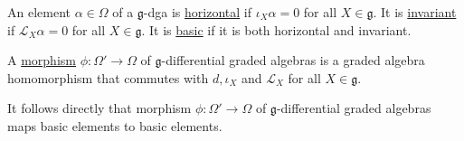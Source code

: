\begin{defn}
	An element $\alpha\in\Omega$ of a $\mathfrak{g}$-dga is 
	\underline{horizontal} if $\iota_X\alpha=0$ for all $X\in\mathfrak{g}$. 
	It is \underline{invariant} if $\mathcal{L}_X\alpha = 0$ for all $X\in
	\mathfrak{g}$. It is \underline{basic} if it is both horizontal and
	invariant.
\end{defn}

\begin{defn} 
	A \underline{morphism} $\phi : \Omega' \to \Omega$ of
	$\mathfrak{g}$-differential graded algebras is a graded algebra homomorphism that
	commutes with  $d,\iota_X$ and  $\mathcal{L}_X$ for all $X\in\mathfrak{g}$.
\end{defn}
It follows directly that 
morphism $\phi : \Omega'\to \Omega$ of $\mathfrak{g}$-differential graded
algebras maps basic elements to basic elements.

\begin{comment} %
\begin{defn}
	A differential form $\alpha\in\Omega(P,V)$ on a principal $G$-bundle  with 
	representation $(V,\rho)$ is \underline{$\rho$-equivariant}   
	if for every $g\in G$, $r_g^*\alpha = \rho(g^{-1})\alpha$. 
	\\
	A differential form $\alpha\in\Omega(P,V)$ on a principal $G$-bundle  with 
	representation $(V,\rho)$ is \underline{basic}  
	if it is horizontal and $\rho$-equivariant. This subspace is
	denoted $\Omega_{bas}(P,V)$.
\end{defn}
Let $P$ be a principle $G$-bundle, and let ($V,\rho$) be a representation of
$G$. Let $E= P\times_\rho V$ be the associated bundle.
\begin{thm} %
	The map $\Omega_{bas}^k(P,V) \to \Omega^k(M,P\times_\rho V)$ given by 
	$\omega \mapsto \alpha_x = f_p \circ \omega_p$
	is a linear isomorphism, where $f_p: V\to E_x$ is the isomorphism  $v\mapsto
	[p,v]$, and $p\in\pi^{-1}(x)$ is any point.
\end{thm}

\begin{cor} %
	There is a natural isomorphism between $\Gamma(M,P\times_\rho V)$ and
	$\rho$-equivariant maps in
	$C^{\infty}(P,V)$, given by sending $s\in C^{\infty}(P,V)^G$ to $s_M$
	defined by  $s_M(x) = [p,s(p)]$, where  $p\in\pi^{-1}(x)$ is any element.
\end{cor}


Recall that a \underline{vertical vector} on a fibre bundle $E$ with base  $M$
is a tangent vector  $X\in TE$ such that  $X(\pi^* f) = 0$ for any  $f\in
C^\infty(M)$. The space $V_pP$ of vertical tangent vectors to a point $p$ in a
principal $G$-bundle can be canonically identified with the Lie algebra $\mathfrak{g}$ 
of $G$ in the following way. 
If $X\in\mathfrak{g}$, the \underline{fundamental vector field} associated to
$X$, denoted $X_P \in \Gamma(VP)$, is
 \[
X_P = \odv{}{t}_{t=0} p \exp (t X)
\] 
This is a vertical vector field because $X_P(\pi^*f) = \odv{}{t}_{t=0} f(p \exp
(t X)) = 0$. 
\end{comment}


